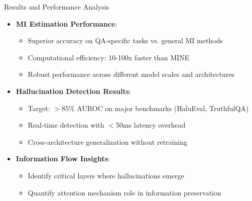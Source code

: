 \documentclass[aspectratio=169]{beamer}
\begin{document}
\begin{frame}{Results and Performance Analysis}
\begin{itemize}
    \item \textbf{MI Estimation Performance}:
    \begin{itemize}
        \item Superior accuracy on QA-specific tasks vs. general MI methods
        \item Computational efficiency: 10-100x faster than MINE
        \item Robust performance across different model scales and architectures
    \end{itemize}
    \item \textbf{Hallucination Detection Results}:
    \begin{itemize}
        \item Target: $>$85\% AUROC on major benchmarks (HaluEval, TruthfulQA)
        \item Real-time detection with $<$50ms latency overhead
        \item Cross-architecture generalization without retraining
    \end{itemize}
    \item \textbf{Information Flow Insights}:
    \begin{itemize}
        \item Identify critical layers where hallucinations emerge
        \item Quantify attention mechanism role in information preservation
    \end{itemize}
\end{itemize}
\end{frame}
\end{document}
